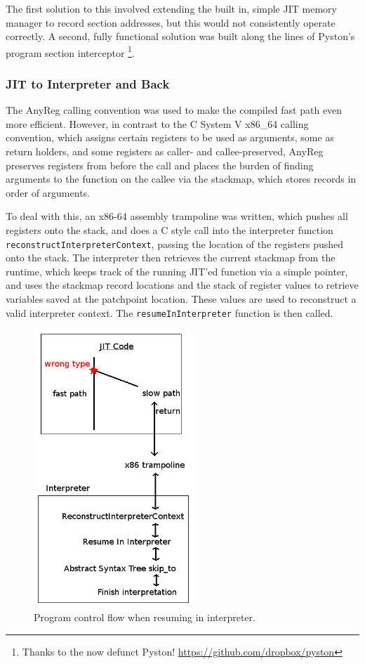 \documentclass[journal,comsoc]{IEEEtran}
\begin{document}
		The first solution to this involved extending the built in, simple JIT memory manager to record section addresses, but this would not consistently operate correctly. A second, fully functional solution was built along the lines of Pyston's program section interceptor \footnote{Thanks to the now defunct Pyston! \url{https://github.com/dropbox/pyston}}.
	
	\subsubsection{JIT to Interpreter and Back} 
	\label{sec:deoptimisation:jitandback}
		
		The AnyReg calling convention was used to make the compiled fast path even more efficient. However, in contrast to the C System V x86\_64 calling convention, which assigns certain registers to be used as arguments, some as return holders, and some registers as caller- and callee-preserved, AnyReg preserves registers from before the call and places the burden of finding arguments to the function on the callee via the stackmap, which stores records in order of arguments.
		
		To deal with this, an x86-64 assembly trampoline was written, which pushes all registers onto the stack, and does a C style call into the interpreter function \lstinline|reconstructInterpreterContext|, passing the location of the registers pushed onto the stack. The interpreter then retrieves the current stackmap from the runtime, which keeps track of the running JIT'ed function via a simple pointer, and uses the stackmap record locations and the stack of register values to retrieve variables saved at the patchpoint location. These values are used to reconstruct a valid interpreter context. The \lstinline|resumeInInterpreter| function is then called.
		
	
		\begin{figure}[htb]
			\centering
			\includegraphics[width=6cm]{./Architecture.png}
			\caption{Program control flow when resuming in interpreter.}
			\label{fig:abc}
		\end{figure}
		
\end{document}
